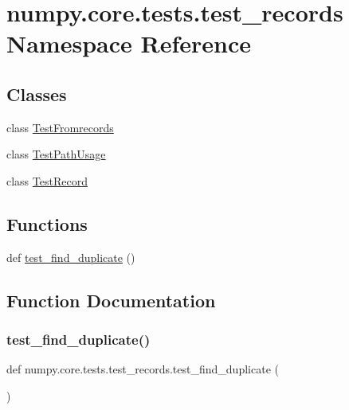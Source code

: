 \hypertarget{namespacenumpy_1_1core_1_1tests_1_1test__records}{}\section{numpy.\+core.\+tests.\+test\+\_\+records Namespace Reference}
\label{namespacenumpy_1_1core_1_1tests_1_1test__records}
\subsection*{Classes}
\begin{DoxyCompactItemize}
\item 
class \hyperlink{classnumpy_1_1core_1_1tests_1_1test__records_1_1TestFromrecords}{Test\+Fromrecords}
\item 
class \hyperlink{classnumpy_1_1core_1_1tests_1_1test__records_1_1TestPathUsage}{Test\+Path\+Usage}
\item 
class \hyperlink{classnumpy_1_1core_1_1tests_1_1test__records_1_1TestRecord}{Test\+Record}
\end{DoxyCompactItemize}
\subsection*{Functions}
\begin{DoxyCompactItemize}
\item 
def \hyperlink{namespacenumpy_1_1core_1_1tests_1_1test__records_a9ff79a6f5a3c01c3a0d7e98dc008d11c}{test\+\_\+find\+\_\+duplicate} ()
\end{DoxyCompactItemize}


\subsection{Function Documentation}
\mbox{\label{namespacenumpy_1_1core_1_1tests_1_1test__records_a9ff79a6f5a3c01c3a0d7e98dc008d11c}} 
\subsubsection{\texorpdfstring{test\+\_\+find\+\_\+duplicate()}{test\_find\_duplicate()}}
{\footnotesize\ttfamily def numpy.\+core.\+tests.\+test\+\_\+records.\+test\+\_\+find\+\_\+duplicate (\begin{DoxyParamCaption}{ }\end{DoxyParamCaption})}

